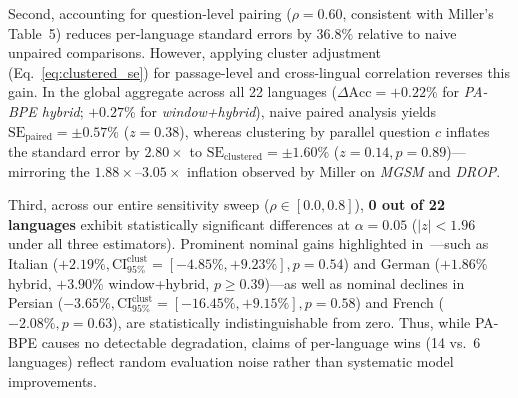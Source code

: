 Second, accounting for question-level pairing ($\rho = 0.60$, consistent with Miller's Table~5) reduces per-language standard errors by $36.8\%$ relative to naive unpaired comparisons. However, applying cluster adjustment (Eq.~\ref{eq:clustered_se}) for passage-level and cross-lingual correlation reverses this gain. In the global aggregate across all 22 languages ($\Delta\mathrm{Acc} = +0.22\%$ for \textit{PA-BPE hybrid}; $+0.27\%$ for \textit{window+hybrid}), naive paired analysis yields $\mathrm{SE}_{\mathrm{paired}} = \pm 0.57\%$ ($z = 0.38$), whereas clustering by parallel question $c$ inflates the standard error by $\mathbf{2.80\times}$ to $\mathrm{SE}_{\mathrm{clustered}} = \pm 1.60\%$ ($z = 0.14, p = 0.89$)---mirroring the $1.88\times$--$3.05\times$ inflation observed by Miller on \textit{MGSM} and \textit{DROP}.

Third, across our entire sensitivity sweep ($\rho \in [0.0, 0.8]$), \textbf{0 out of 22 languages} exhibit statistically significant differences at $\alpha = 0.05$ ($|z| < 1.96$ under all three estimators). Prominent nominal gains highlighted in~\cite{foroutan2026parity}---such as Italian ($+2.19\%, \mathrm{CI}_{95\%}^{\mathrm{clust}} = [-4.85\%, +9.23\%], p = 0.54$) and German ($+1.86\%$ hybrid, $+3.90\%$ window+hybrid, $p \ge 0.39$)---as well as nominal declines in Persian ($-3.65\%, \mathrm{CI}_{95\%}^{\mathrm{clust}} = [-16.45\%, +9.15\%], p = 0.58$) and French ($-2.08\%, p = 0.63$), are statistically indistinguishable from zero. Thus, while PA-BPE causes no detectable degradation, claims of per-language wins (14 vs.\ 6 languages) reflect random evaluation noise rather than systematic model improvements.



